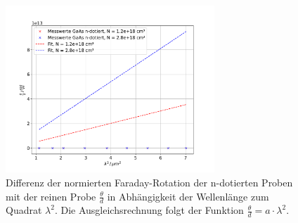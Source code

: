 \begin{figure}
    \centering
    \includegraphics[width=0.7\textwidth]{figure/theta_lam2_dif.pdf}
    \caption{Differenz der normierten Faraday-Rotation der n-dotierten Proben mit der reinen Probe $\frac{\theta}{d}$ in Abhängigkeit der Wellenlänge zum Quadrat $\lambda^2$.
    Die Ausgleichsrechnung folgt der Funktion $\frac{\theta}{d} = a\cdot \lambda^2$.
    }
    \label{fig:theta_dif_lam2}
\end{figure}